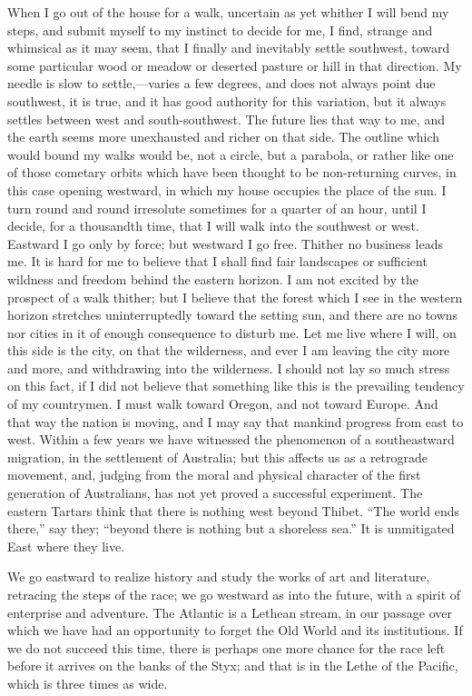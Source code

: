 \documentclass[twoside,openright,10pt]{memoir} %
\begin{document}
When I go out of the house for a walk, uncertain as yet whither I will bend my steps, and submit myself to my instinct to decide for me, I find, strange and whimsical as it may seem, that I finally and inevitably settle southwest, toward some particular wood or meadow or deserted pasture or hill in that direction. My needle is slow to settle,—varies a few degrees, and does not always point due southwest, it is true, and it has good authority for this variation, but it always settles between west and south-southwest. The future lies that way to me, and the earth seems more unexhausted and richer on that side. The outline which would bound my walks would be, not a circle, but a parabola, or rather like one of those cometary orbits which have been thought to be non-returning curves, in this case opening westward, in which my house occupies the place of the sun. I turn round and round irresolute sometimes for a quarter of an hour, until I decide, for a thousandth time, that I will walk into the southwest or west. Eastward I go only by force; but westward I go free. Thither no business leads me. It is hard for me to believe that I shall find fair landscapes or sufficient wildness and freedom behind the eastern horizon. I am not excited by the prospect of a walk thither; but I believe that the forest which I see in the western horizon stretches uninterruptedly toward the setting sun, and there are no towns nor cities in it of enough consequence to disturb me. Let me live where I will, on this side is the city, on that the wilderness, and ever I am leaving the city more and more, and withdrawing into the wilderness. I should not lay so much stress on this fact, if I did not believe that something like this is the prevailing tendency of my countrymen. I must walk toward Oregon, and not toward Europe. And that way the nation is moving, and I may say that mankind progress from east to west. Within a few years we have witnessed the phenomenon of a southeastward migration, in the settlement of Australia; but this affects us as a retrograde movement, and, judging from the moral and physical character of the first generation of Australians, has not yet proved a successful experiment. The eastern Tartars think that there is nothing west beyond Thibet. “The world ends there,” say they; “beyond there is nothing but a shoreless sea.” It is unmitigated East where they live.

We go eastward to realize history and study the works of art and literature, retracing the steps of the race; we go westward as into the future, with a spirit of enterprise and adventure. The Atlantic is a Lethean stream, in our passage over which we have had an opportunity to forget the Old World and its institutions. If we do not succeed this time, there is perhaps one more chance for the race left before it arrives on the banks of the Styx; and that is in the Lethe of the Pacific, which is three times as wide.
\end{document}
